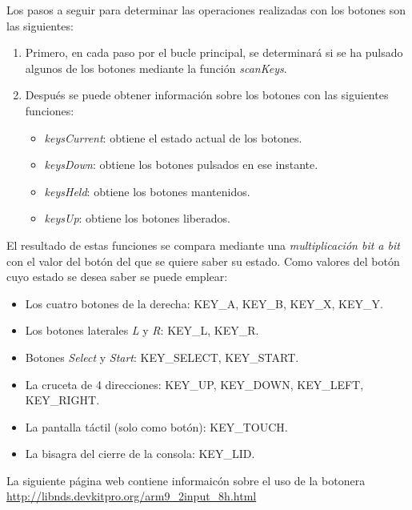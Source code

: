 Los pasos a seguir para determinar las operaciones realizadas con los botones son las siguientes:
\begin{enumerate}
\item Primero, en cada paso por el bucle principal, se determinará si se ha pulsado algunos de los botones mediante la función \textit{scanKeys}. 
%
\item Después se puede  obtener información sobre los botones con las siguientes funciones:
\begin{itemize}
	\item \textit{keysCurrent}: obtiene el estado actual de los botones.
	\item \textit{keysDown}: obtiene los botones pulsados en ese instante.
	\item \textit{keysHeld}: obtiene los botones mantenidos.
	\item \textit{keysUp}: obtiene los botones liberados.
\end{itemize}
\end{enumerate}

El resultado de estas funciones se compara mediante una \textit{multiplicación bit a bit} con el valor del botón del que se quiere saber su estado. Como valores del botón cuyo estado se desea saber se puede emplear: 
\begin{itemize}
\item Los cuatro botones de la derecha: KEY\_A, KEY\_B, KEY\_X, KEY\_Y.
\item Los botones laterales \textit{L} y \textit{R}: KEY\_L, KEY\_R.
\item Botones \textit{Select} y \textit{Start}: KEY\_SELECT, KEY\_START.
\item La cruceta de 4 direcciones: KEY\_UP, KEY\_DOWN, KEY\_LEFT, KEY\_RIGHT.
\item La pantalla táctil (solo como botón): KEY\_TOUCH.
\item La bisagra del cierre de la consola: KEY\_LID.
\end{itemize}

La siguiente página web contiene informaicón sobre el uso de la botonera \url{http://libnds.devkitpro.org/arm9_2input_8h.html}

